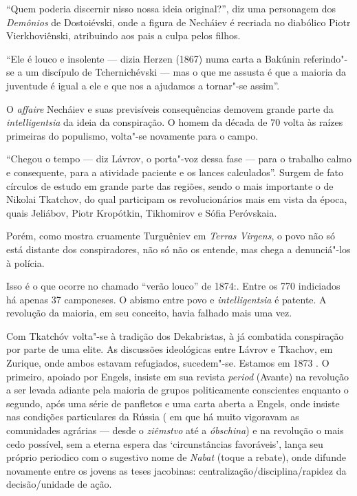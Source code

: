 ``Quem poderia discernir nisso nossa ideia original?'', diz uma
personagem dos \emph{Demônios} de Dostoiévski, onde a figura de Necháiev
é recriada no diabólico Piotr Vierkhoviênski, atribuindo aos pais a
culpa pelos filhos.

``Ele é louco e insolente --- dizia Herzen (1867) numa carta a Bakúnin
referindo"-se a um discípulo de Tchernichévski --- mas o que me assusta é
que a maioria da juventude é igual a ele e que nos a ajudamos a
tornar"-se assim''.

O \emph{affaire} Necháiev e suas previsíveis consequências demovem
grande parte da \emph{intelligentsia} da ideia da conspiração. O homem
da década de 70 volta às raízes primeiras do populismo, volta"-se
novamente para o campo.

``Chegou o tempo --- diz Lávrov, o porta"-voz dessa fase --- para o
trabalho calmo e consequente, para a atividade paciente e os lances
calculados''. Surgem de fato círculos de estudo em grande parte das
regiões, sendo o mais importante o de Nikolai Tkatchov, do qual
participam os revolucionários mais em vista da época, quais Jeliábov,
Piotr Kropótkin, Tikhomirov e Sófia Peróvskaia.

Porém, como mostra cruamente Turguêniev em \emph{Terras Virgens}, o povo
não só está distante dos conspiradores, não só não os entende, mas chega
a denunciá"-los à polícia.

Isso é o que ocorre no chamado ``verão louco'' de 1874:. Entre os 770
indiciados há apenas 37 camponeses. O abismo entre povo e
\emph{intelligentsia} é patente. A revolução da maioria, em seu
conceito, havia falhado mais uma vez.

Com Tkatchóv volta"-se à tradição dos Dekabristas, à já combatida
conspiração por parte de uma elite. As discussões ideológicas entre
Lávrov e Tkachov, em Zurique, onde ambos estavam refugiados, sucedem"-se.
Estamos em 1873 . O primeiro, apoiado por Engels, insiste em sua revista
\emph{ period} (Avante) na revolução a ser levada adiante pela maioria
de grupos politicamente conscientes enquanto o segundo, após uma série
de panfletos e uma carta aberta a Engels, onde insiste nas condições
particulares da Rússia ( em que há muito vigoravam as comunidades
agrárias --- desde o \emph{ziêmstvo} até a \emph{óbschina}) e na
revolução o mais cedo possível, sem a eterna espera das `circunstâncias
favoráveis', lança seu próprio periodico com o sugestivo nome de
\emph{Nabat} (toque a rebate), onde difunde novamente entre os jovens as
teses jacobinas: centralização/disciplina/rapidez da decisão/unidade de
ação.

